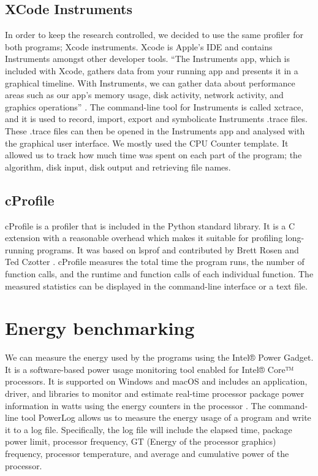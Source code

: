 \subsection{XCode Instruments}
In order to keep the research controlled, we decided to use the same profiler for both programs; Xcode instruments. Xcode is Apple’s IDE and contains Instruments amongst other developer tools. “The Instruments app, which is included with Xcode, gathers data from your running app and presents it in a graphical timeline. With Instruments, we can gather data about performance areas such as our app’s memory usage, disk activity, network activity, and graphics operations” \cite{instruments}. The command-line tool for Instruments is called xctrace, and it is used to record, import, export and symbolicate Instruments .trace files. These .trace files can then be opened in the Instruments app and analysed with the graphical user interface. We mostly used the CPU Counter template. It allowed us to track how much time was spent on each part of the program; the algorithm, disk input, disk output and retrieving file names.

\subsection{cProfile}
cProfile is a profiler that is included in the Python standard library. It is a C extension with a reasonable overhead which makes it suitable for profiling long-running programs. It was based on lsprof and contributed by Brett Rosen and Ted Czotter \cite{cprofile}. cProfile measures the total time the program runs, the number of function calls, and the runtime and function calls of each individual function. The measured statistics can be displayed in the command-line interface or a text file.

\section{Energy benchmarking}
We can measure the energy used by the programs using the Intel® Power Gadget. It is a software-based power usage monitoring tool enabled for Intel® Core™ processors. It is supported on Windows and macOS and includes an application, driver, and libraries to monitor and estimate real-time processor package power information in watts using the energy counters in the processor \cite{powergadget}. The command-line tool PowerLog allows us to measure the energy usage of a program and write it to a log file. Specifically, the log file will include the elapsed time, package power limit, processor frequency, GT (Energy of the processor graphics) frequency, processor temperature, and average and cumulative power of the processor.


